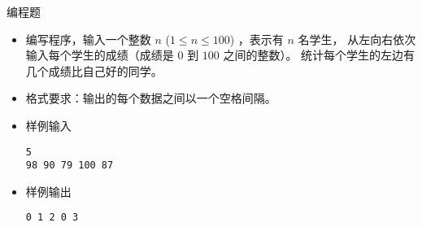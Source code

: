 \begin{frame}[fragile]
{{\begin{itemize}
            \end{itemize}
            
        }{
            \begin{exampleblock}{编程题}

                \begin{itemize}
                    \item 编写程序，输入一个整数 $n$ ($1 \le n \le 100$) ，表示有 $n$ 名学生，
                    从左向右依次输入每个学生的成绩（成绩是 $0$ 到 $100$ 之间的整数）。
                    统计每个学生的左边有几个成绩比自己好的同学。
                    
                    \item 格式要求：输出的每个数据之间以一个空格间隔。
        
                    \item 样例输入
        
                        \lstinline|5|\\
                        \lstinline|98 90 79 100 87|
        
                    \item 样例输出
        
                        \lstinline|0 1 2 0 3|
        
                \end{itemize}
        
            \end{exampleblock}
        }
    }

\end{frame}

